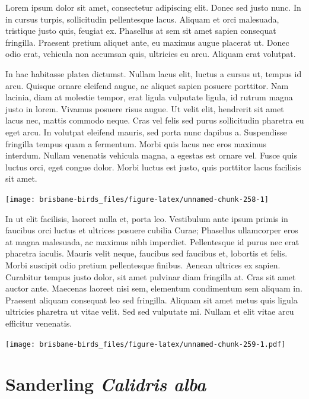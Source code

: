 \documentclass[]{book}
\let\origfigure\figure
\let\endorigfigure\endfigure
\renewenvironment{figure}[1][2] {
  \expandafter\origfigure\expandafter[H]
} {
  \endorigfigure
}
\begin{document}
Lorem ipsum dolor sit amet, consectetur adipiscing elit. Donec sed justo
nunc. In in cursus turpis, sollicitudin pellentesque lacus. Aliquam et
orci malesuada, tristique justo quis, feugiat ex. Phasellus at sem sit
amet sapien consequat fringilla. Praesent pretium aliquet ante, eu
maximus augue placerat ut. Donec odio erat, vehicula non accumsan quis,
ultricies eu arcu. Aliquam erat volutpat.

In hac habitasse platea dictumst. Nullam lacus elit, luctus a cursus ut,
tempus id arcu. Quisque ornare eleifend augue, ac aliquet sapien posuere
porttitor. Nam lacinia, diam at molestie tempor, erat ligula vulputate
ligula, id rutrum magna justo in lorem. Vivamus posuere risus augue. Ut
velit elit, hendrerit sit amet lacus nec, mattis commodo neque. Cras vel
felis sed purus sollicitudin pharetra eu eget arcu. In volutpat eleifend
mauris, sed porta nunc dapibus a. Suspendisse fringilla tempus quam a
fermentum. Morbi quis lacus nec eros maximus interdum. Nullam venenatis
vehicula magna, a egestas est ornare vel. Fusce quis luctus orci, eget
congue dolor. Morbi luctus est justo, quis porttitor lacus facilisis sit
amet.

\begin{figure}
\texttt{[image: brisbane-birds\_files/figure-latex/unnamed-chunk-258-1]} \caption{insert figure caption}\label{fig:unnamed-chunk-258}
\end{figure}

In ut elit facilisis, laoreet nulla et, porta leo. Vestibulum ante ipsum
primis in faucibus orci luctus et ultrices posuere cubilia Curae;
Phasellus ullamcorper eros at magna malesuada, ac maximus nibh
imperdiet. Pellentesque id purus nec erat pharetra iaculis. Mauris velit
neque, faucibus sed faucibus et, lobortis et felis. Morbi suscipit odio
pretium pellentesque finibus. Aenean ultrices ex sapien. Curabitur
tempus justo dolor, sit amet pulvinar diam fringilla at. Cras sit amet
auctor ante. Maecenas laoreet nisi sem, elementum condimentum sem
aliquam in. Praesent aliquam consequat leo sed fringilla. Aliquam sit
amet metus quis ligula ultricies pharetra ut vitae velit. Sed sed
vulputate mi. Nullam et elit vitae arcu efficitur venenatis.

\begin{figure}
\centering
\texttt{[image: brisbane-birds\_files/figure-latex/unnamed-chunk-259-1.pdf]}
\caption{\label{fig:unnamed-chunk-259}insert figure caption}
\end{figure}

\section{\texorpdfstring{Sanderling \emph{Calidris
alba}}{Sanderling Calidris alba}}\label{sanderling-calidris-alba}
\end{document}

